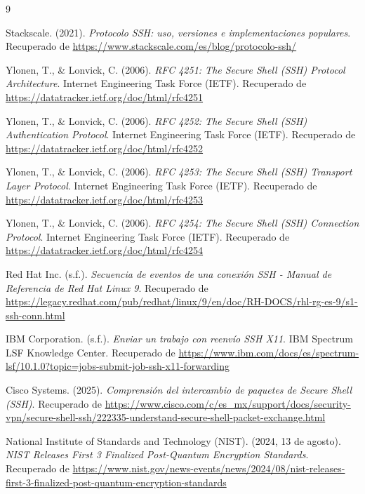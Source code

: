\documentclass[a4paper,12pt]{article}
\begin{document}
\newpage

\begin{thebibliography}{9}

     Stackscale. (2021). \textit{Protocolo SSH: uso, versiones e implementaciones populares}. Recuperado de \url{https://www.stackscale.com/es/blog/protocolo-ssh/}

     Ylonen, T., \& Lonvick, C. (2006). \textit{RFC 4251: The Secure Shell (SSH) Protocol Architecture}. Internet Engineering Task Force (IETF). Recuperado de \url{https://datatracker.ietf.org/doc/html/rfc4251}

     Ylonen, T., \& Lonvick, C. (2006). \textit{RFC 4252: The Secure Shell (SSH) Authentication Protocol}. Internet Engineering Task Force (IETF). Recuperado de \url{https://datatracker.ietf.org/doc/html/rfc4252}

     Ylonen, T., \& Lonvick, C. (2006). \textit{RFC 4253: The Secure Shell (SSH) Transport Layer Protocol}. Internet Engineering Task Force (IETF). Recuperado de \url{https://datatracker.ietf.org/doc/html/rfc4253}

     Ylonen, T., \& Lonvick, C. (2006). \textit{RFC 4254: The Secure Shell (SSH) Connection Protocol}. Internet Engineering Task Force (IETF). Recuperado de \url{https://datatracker.ietf.org/doc/html/rfc4254}

     Red Hat Inc. (s.f.). \textit{Secuencia de eventos de una conexión SSH - Manual de Referencia de Red Hat Linux 9}. Recuperado de \url{https://legacy.redhat.com/pub/redhat/linux/9/en/doc/RH-DOCS/rhl-rg-es-9/s1-ssh-conn.html}

     IBM Corporation. (s.f.). \textit{Enviar un trabajo con reenvío SSH X11}. IBM Spectrum LSF Knowledge Center. Recuperado de \url{https://www.ibm.com/docs/es/spectrum-lsf/10.1.0?topic=jobs-submit-job-ssh-x11-forwarding}

     Cisco Systems. (2025). \textit{Comprensión del intercambio de paquetes de Secure Shell (SSH)}. Recuperado de \url{https://www.cisco.com/c/es_mx/support/docs/security-vpn/secure-shell-ssh/222335-understand-secure-shell-packet-exchange.html}

     National Institute of Standards and Technology (NIST). (2024, 13 de agosto). \textit{NIST Releases First 3 Finalized Post-Quantum Encryption Standards}. Recuperado de \url{https://www.nist.gov/news-events/news/2024/08/nist-releases-first-3-finalized-post-quantum-encryption-standards}


\end{thebibliography}
\end{document}

